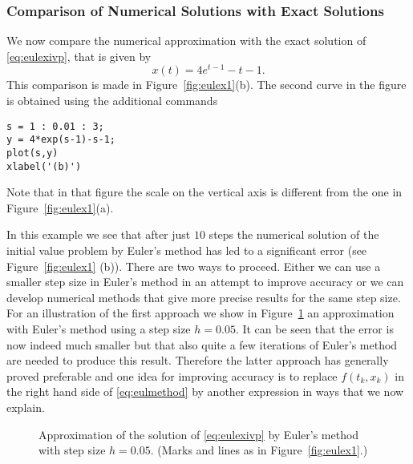\documentclass{ximera}
\begin{document}
\subsubsection*{Comparison of Numerical Solutions with Exact Solutions}

We now compare the numerical approximation with the exact solution 
of \eqref{eq:eulexivp}, that is given by
\[
x(t) = 4e^{t-1}-t-1.
\]
This comparison is made in Figure~\ref{fig:eulex1}(b).  The second
curve in the figure is obtained using the additional commands
\begin{verbatim}
s = 1 : 0.01 : 3;
y = 4*exp(s-1)-s-1;  
plot(s,y)        
xlabel('(b)')
\end{verbatim}
Note that in that figure the scale on the vertical axis is
different from the one in Figure~\ref{fig:eulex1}(a).
\begin{figure*}[htb]
   \centerline{%
   }
   \caption{Approximation of the solution of 
   \protect\eqref{eq:eulexivp} by Euler's method.  
   (a) Circles mark the computed points; dashed lines 
    are linear interpolations between the o's.  (b)  A comparison is 
    made to the exact solution pictured as a solid line.}
   \label{fig:eulex1}
\end{figure*}


In this example we see that after just $10$ steps the numerical solution 
of the initial value problem 
by Euler's method has led to a significant 
error (see Figure~\ref{fig:eulex1} (b)).  There are two ways to proceed.
Either we can use a smaller step size in 
Euler's method in an attempt to 
improve accuracy or we can develop numerical methods that give more 
precise results for the same step size. For an illustration of the
first approach we show in Figure~\ref{fig:eulimpr}
an approximation with Euler's method using a step size
$h=0.05$.  It can be seen that the error is now indeed much smaller
but that also quite a few iterations of Euler's method are needed 
to produce this result.  Therefore the latter approach has 
generally proved preferable and one idea for improving accuracy is 
to replace $f(t_k,x_k)$ in the right hand side of 
\eqref{eq:eulmethod} by another expression in ways that we now explain.
\begin{figure}[htb]
   \centerline{%
   }
   \caption{Approximation of the solution of
   \protect\eqref{eq:eulexivp} by Euler's method with step size
   $h=0.05$.  (Marks and lines as in Figure~\protect\ref{fig:eulex1}.)}
   \label{fig:eulimpr}
\end{figure}
\end{document}
